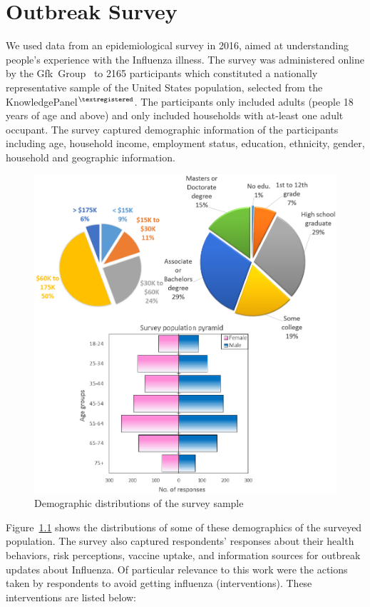 \documentclass[doublespace,draft]{VTthesis}
\begin{document}
	\chapter{Outbreak Survey} \label{ch:survey}
	We used data from an epidemiological survey in 2016, aimed at understanding people's experience with the Influenza illness. The survey was administered online by the  Gfk~Group~\cite{wiki:wikigfk} to 2165 participants which constituted a nationally representative sample of the United States population, selected from the KnowledgePanel$^{\textregistered}$. The participants only included adults (people 18 years of age and above) and only included households with at-least one adult occupant. The survey captured demographic information of the participants including age, household income, employment status, education, ethnicity, gender, household and geographic information.
	\begin{figure}
    \centering
    \includegraphics[width=\textwidth]{figures/demographics.png}
    \caption{Demographic distributions of the survey sample}
    \label{fig:demog}
    \end{figure}
	Figure~\ref{fig:demog} shows the distributions of some of these demographics of the surveyed population. The survey also captured respondents' responses about their health behaviors, risk perceptions, vaccine uptake, and information sources for outbreak updates about Influenza. Of particular relevance to this work were the actions taken by respondents to avoid getting influenza (interventions). These interventions are listed below: 
\end{document}
